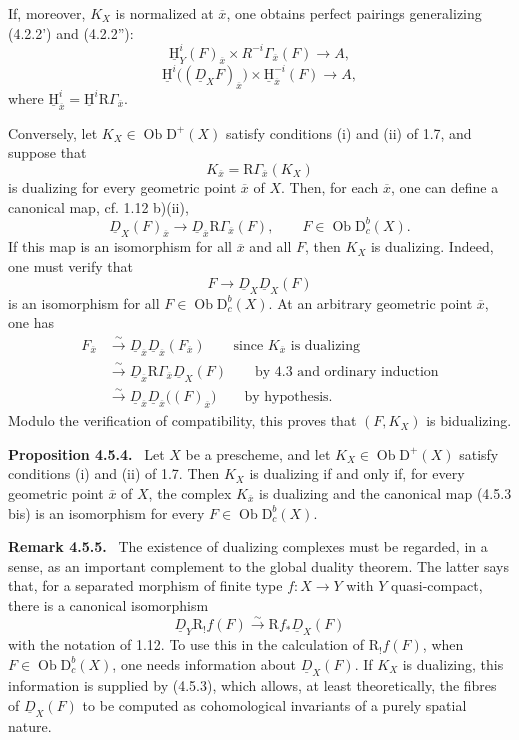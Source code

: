 \documentclass[12pt]{article}
\newcommand{\ob}{\operatorname{Ob}}
\newcommand{\D}{\mathrm D}
\newcommand{\R}{\mathrm R}
\newcommand{\ol}[1]{\overline{#1}}
\newcommand{\uH}{\underline{\mathrm H}}
\newenvironment{statement}[1]{\par\medskip\noindent\textbf{#1.}\ }{\par\medskip}
\begin{document}
If, moreover, $K_X$ is normalized at $\ol x$, one obtains perfect pairings generalizing (4.2.2') and (4.2.2''):
\[
   \uH^i_Y(F)_{\ol x}\times R^{-i}\Gamma_{\ol x}(F)\longrightarrow A,\tag{4.5.3'}
\]
\[
   \uH^i\bigl((\underline D_XF)_{\ol x}\bigr)\times
      \uH^{-i}_{\ol x}(F)\longrightarrow A,\tag{4.5.3''}
\]
where $\uH^i_{\ol x}=\uH^i\R\Gamma_{\ol x}$.

Conversely, let $K_X\in\ob\D^+(X)$ satisfy conditions (i) and (ii) of 1.7, and suppose that
\[
   K_{\ol x}=\R\Gamma_{\ol x}(K_X)
\]
is dualizing for every geometric point $\ol x$ of $X$. Then, for each $\ol x$, one can define a canonical map, cf. 1.12 b)(ii),
\[
   \underline D_X(F)_{\ol x}
      \longrightarrow \underline D_{\ol x}\R\Gamma_{\ol x}(F),
      \qquad F\in\ob\D_c^b(X).\tag{4.5.3 bis}
\]
If this map is an isomorphism for all $\ol x$ and all $F$, then $K_X$ is dualizing. Indeed, one must verify that
\[
   F\longrightarrow\underline D_X\underline D_X(F)
\]
is an isomorphism for all $F\in\ob\D_c^b(X)$. At an arbitrary geometric point $\ol x$, one has
\[
\begin{aligned}
F_{\ol x}
&\xrightarrow{\sim}\underline D_{\ol x}\underline D_{\ol x}(F_{\ol x})
     \qquad\text{since $K_{\ol x}$ is dualizing}\\
&\xrightarrow{\sim}\underline D_{\ol x}\R\Gamma_{\ol x}\underline D_X(F)
     \qquad\text{by 4.3 and ordinary induction}\\
&\xrightarrow{\sim}\underline D_{\ol x}\underline D_{\ol x}\bigl((F)_{\ol x}\bigr)
     \qquad\text{by hypothesis}.
\end{aligned}
\]
Modulo the verification of compatibility, this proves that $(F,K_X)$ is bidualizing.

\begin{statement}{Proposition 4.5.4}
Let $X$ be a prescheme, and let $K_X\in\ob\D^+(X)$ satisfy conditions (i) and (ii) of 1.7. Then $K_X$ is dualizing if and only if, for every geometric point $\ol x$ of $X$, the complex $K_{\ol x}$ is dualizing and the canonical map (4.5.3 bis) is an isomorphism for every $F\in\ob\D_c^b(X)$.
\end{statement}

\begin{statement}{Remark 4.5.5}
The existence of dualizing complexes must be regarded, in a sense, as an important complement to the global duality theorem. The latter says that, for a separated morphism of finite type $f:X\to Y$ with $Y$ quasi-compact, there is a canonical isomorphism
\[
   \underline D_Y\R_!f(F)\xrightarrow{\sim}\R f_*\underline D_X(F)
\]
with the notation of 1.12. To use this in the calculation of $\R_!f(F)$, when $F\in\ob\D_c^b(X)$, one needs information about $\underline D_X(F)$. If $K_X$ is dualizing, this information is supplied by (4.5.3), which allows, at least theoretically, the fibres of $\underline D_X(F)$ to be computed as cohomological invariants of a purely spatial nature.
\end{statement}
\end{document}

